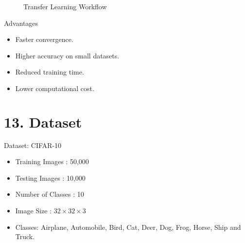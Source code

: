 \documentclass[11pt]{article}
\begin{document}
\begin{figure}[H]

\centering


\caption{Transfer Learning Workflow}

\end{figure}

Advantages

\begin{itemize}
\item Faster convergence.
\item Higher accuracy on small datasets.
\item Reduced training time.
\item Lower computational cost.
\end{itemize}


\section*{13. Dataset}

Dataset: CIFAR-10

\begin{itemize}

\item Training Images : 50,000

\item Testing Images : 10,000

\item Number of Classes : 10

\item Image Size : $32\times32\times3$

\item Classes:
Airplane, Automobile, Bird, Cat, Deer,
Dog, Frog, Horse, Ship and Truck.

\end{itemize}
\end{document}

